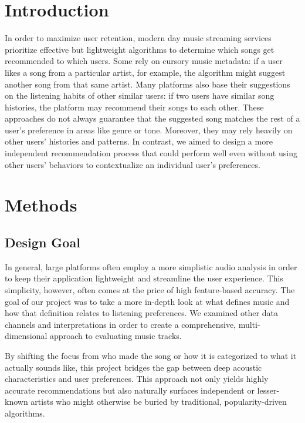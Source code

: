 
\usepackage{lipsum}
\date{\today}


\maketitle

\section{Introduction}
In order to maximize user retention, modern day music streaming services prioritize effective but lightweight algorithms to determine which songs get recommended to which users. Some rely on cursory music metadata: if a user likes a song from a particular artist, for example, the algorithm might suggest another song from that same artist. Many platforms also base their suggestions on the listening habits of other similar users: if two users have similar song histories, the platform may recommend their songs to each other. These approaches do not always guarantee that the suggested song matches the rest of a user’s preference in areas like genre or tone. Moreover, they may rely heavily on other users’ histories and patterns. In contrast, we aimed to design a more independent recommendation process that could perform well even without using other users’ behaviors to contextualize an individual user’s preferences.
\section{Methods}

\subsection{Design Goal}
In general, large platforms often employ a more simplistic audio analysis in order to keep their application lightweight and streamline the user experience. This simplicity, however, often comes at the price of high feature-based accuracy. The goal of our project was to take a more in-depth look at what defines music and how that definition relates to listening preferences. We examined other data channels and interpretations in order to create a comprehensive, multi-dimensional approach to evaluating music tracks.

By shifting the focus from who made the song or how it is categorized to what it actually sounds like, this project bridges the gap between deep acoustic characteristics and user preferences. This approach not only yields highly accurate recommendations but also naturally surfaces independent or lesser-known artists who might otherwise be buried by traditional, popularity-driven algorithms.

